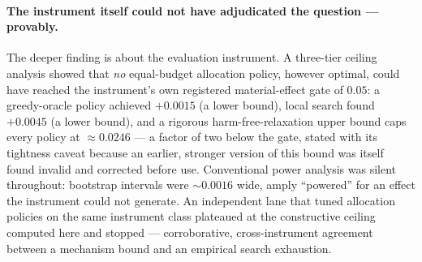 \paragraph{The instrument itself could not have adjudicated the question --- provably.}
The deeper finding is about the evaluation instrument. A three-tier ceiling analysis showed that \emph{no} equal-budget allocation policy, however optimal, could have reached the instrument's own registered material-effect gate of $0.05$: a greedy-oracle policy achieved $+0.0015$ (a lower bound), local search found $+0.0045$ (a lower bound), and a rigorous harm-free-relaxation upper bound caps every policy at ${\approx}0.0246$ --- a factor of two below the gate, stated with its tightness caveat because an earlier, stronger version of this bound was itself found invalid and corrected before use. Conventional power analysis was silent throughout: bootstrap intervals were ${\sim}0.0016$ wide, amply ``powered'' for an effect the instrument could not generate. An independent lane that tuned allocation policies on the same instrument class plateaued at the constructive ceiling computed here and stopped --- corroborative, cross-instrument agreement between a mechanism bound and an empirical search exhaustion.

